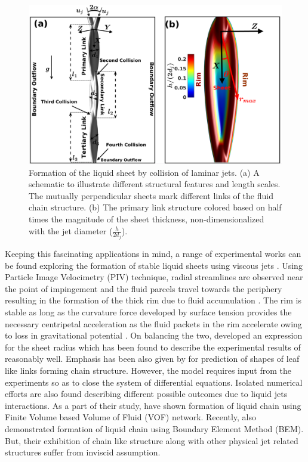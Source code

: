 \documentclass{jfm}
\begin{document}
\begin{figure}
	\centering
	\includegraphics[width=0.6\linewidth]{Figure1}
	\caption{Formation of the liquid sheet by collision of laminar jets. (a) A schematic to illustrate different structural features and length scales. The mutually perpendicular sheets mark different links of the fluid chain structure. (b) The primary link structure colored based on half times the magnitude of the sheet thickness, non-dimensionalized with the jet diameter ($\frac{h}{2d_j}$).}
	\label{Figure::schematic}
\end{figure}
Keeping this fascinating applications in mind, a range of  experimental works can be found exploring the formation of stable liquid sheets using viscous jets \citep{choo2001parametric,choo2002velocity,bush2004collision,inamura2014effect}. Using Particle Image Velocimetry (PIV) technique, radial streamlines are observed near the point of impingement and the fluid parcels travel towards the periphery resulting in the formation of the thick rim due to fluid accumulation \citep{choo2002velocity,bush2004collision}. The rim is stable as long as the curvature force developed by surface tension provides the necessary centripetal acceleration as the fluid packets in the rim accelerate owing to loss in gravitational potential \citep{bremond2006atomization}. On balancing the two, \cite{taylor1960formation} developed an expression for the sheet radius which has been found to describe the experimental results of \cite{bush2004collision} reasonably well. Emphasis has been also given by \cite{bush2004collision} for prediction of shapes of leaf like links forming chain structure. However, the model requires input from the experiments so as to close the system of differential equations. Isolated numerical efforts are also found describing different possible outcomes due to liquid jets interactions. As a part of their study, \cite{ma2011atomization,chen2013high} have shown formation of liquid chain using Finite Volume based Volume of Fluid (VOF) network. Recently, \cite{da2016surface} also demonstrated formation of liquid chain using Boundary Element Method (BEM). But, their exhibition of chain like structure along with other physical jet related structures suffer from inviscid assumption.\\
\end{document}
